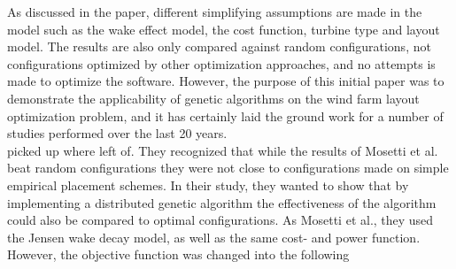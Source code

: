 \begin{center}
\begin{table}[h!]
\caption{Optimized configurations compared against random configurations for each of the three scenarios (a) single wind direction, (b) multiple wind direction with constant intensity and (c) multiple wind direction and intensity {\citep{Mosetti}}.}
\label{Results Mosetti et al.}
\end{table}
\end{center}


\noindent As discussed in the paper, different simplifying assumptions are made in the model such as the wake effect model, the cost function, turbine type and layout model. The results are also only compared against random configurations, not configurations optimized by other optimization approaches, and no attempts is made to optimize the software. However, the purpose of this initial paper was to demonstrate the applicability of genetic algorithms on the wind farm layout optimization problem, and it has certainly laid the ground work for a number of studies performed over the last 20 years. \\


\noindent \cite{Grady} picked up where \cite{Mosetti} left of. They recognized that while the results of Mosetti et al. beat random configurations they were not close to configurations made on simple empirical placement schemes. In their study, they wanted to show that by implementing a distributed genetic algorithm the effectiveness of the algorithm could also be compared to optimal configurations.	 As Mosetti et al., they used the Jensen wake decay model, as well as the same cost- and power function. However, the objective function was changed into the following

